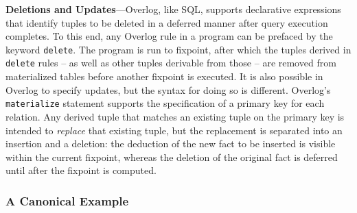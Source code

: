 \documentclass{sigmod08}
\newcommand{\ol}[1]{\texttt{\small #1}\xspace}
\newcommand{\stitle}[1]{\textbf{#1}---}
\begin{document}
\stitle{Deletions and Updates}Overlog, like SQL, supports declarative
expressions that identify tuples to be deleted in a deferred manner
after query execution completes.  To this end, any Overlog rule in a
program can be prefaced by the keyword \ol{delete}.  The program is run to fixpoint, after which the tuples derived in  {\tt
  delete} rules -- as well as other tuples derivable from those -- are removed
from materialized tables before another
fixpoint is executed. It is also possible in Overlog to specify
updates, but the syntax for doing so is different.  Overlog's {\tt
  materialize} statement supports the specification of a primary key for
each relation.  Any derived tuple that matches an existing tuple on the
primary key is intended to {\em replace} that existing tuple, but
the replacement is separated into an insertion and a deletion: the
deduction of the new fact to be inserted is visible within the current
fixpoint, whereas the deletion of the original fact is deferred until
after the fixpoint is computed.

    \subsubsection{A Canonical Example}
        \label{sec:declnet}
\end{document}
